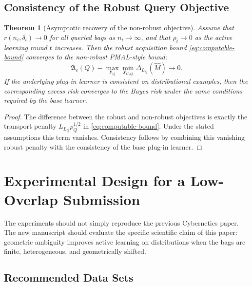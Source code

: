 \documentclass[11pt,a4paper]{article}
\newtheorem{theorem}{Theorem}
\begin{document}
\subsection{Consistency of the Robust Query Objective}

\begin{theorem}[Asymptotic recovery of the non-robust objective]
\label{thm:consistency}
Assume that $r(n_i,\delta_i)\to 0$ for all queried bags as $n_i\to\infty$, and that $\rho_t\to 0$ as the active learning round $t$ increases. Then the robust acquisition bound \eqref{eq:computable-bound} converges to the non-robust PMAL-style bound:
\begin{equation}
\overline{\mathfrak{A}}_\varepsilon(Q)-
\max_{\bm y_Q}\min_{\bm y_{U\setminus Q}}\Delta_{L_Q}(\widehat M)
\to 0.
\end{equation}
If the underlying plug-in learner is consistent on distributional examples, then the corresponding excess risk converges to the Bayes risk under the same conditions required by the base learner.
\end{theorem}

\begin{proof}
The difference between the robust and non-robust objectives is exactly the transport penalty $L_{L_Q}\rho_Q^{1/2}$ in \eqref{eq:computable-bound}. Under the stated assumptions this term vanishes. Consistency follows by combining this vanishing robust penalty with the consistency of the base plug-in learner.
\end{proof}

\section{Experimental Design for a Low-Overlap Submission}

The experiments should not simply reproduce the previous Cybernetics paper. The new manuscript should evaluate the specific scientific claim of this paper: geometric ambiguity improves active learning on distributions when the bags are finite, heterogeneous, and geometrically shifted.

\subsection{Recommended Data Sets}
\end{document}
